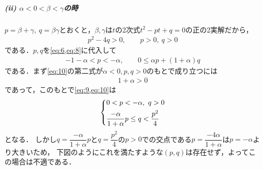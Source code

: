 \documentclass[../../main.tex]{subfiles}
\begin{document}
\subparagraph{(ii) $\alpha<0<\beta<\gamma$の時}

$p=\beta+\gamma,\ q=\beta\gamma$とおくと，$\beta,\gamma$は$t$の2次式$t^2-pt+q=0$の正の2実解だから，
\begin{align}
  p^2-4q>0, \qquad p>0,\ q>0 \label{eq:9}
\end{align}
である．$p,q$を\cref{eq:6,eq:8}に代入して
\begin{align}
  -1-\alpha<p<-\alpha, \qquad 0\le\alpha p+(1+\alpha)q \label{eq:10}
\end{align}
である．まず\cref{eq:10}の第二式が$\alpha<0, p,q>0$のもとで成り立つには
\begin{align}
  1+\alpha > 0 \label{eq:11}
\end{align}
であって，このもとで\cref{eq:9,eq:10}は
\begin{align}
  \begin{dcases}
    0<p<-\alpha,\ q>0 \\
    \dfrac{-\alpha}{1+\alpha}p \le q < \dfrac{p^2}{4}
  \end{dcases} \label{eq:12}
\end{align}
となる．
しかし$q=\dfrac{-\alpha}{1+\alpha}p$と$q=\dfrac{p^2}{4}$の$p>0$での交点である$p=\dfrac{-4\alpha}{1+\alpha}$は$p=-\alpha$より大きいため，
下図のようにこれを満たすような$(p,q)$は存在せず，よってこの場合は不適である．
\end{document}
